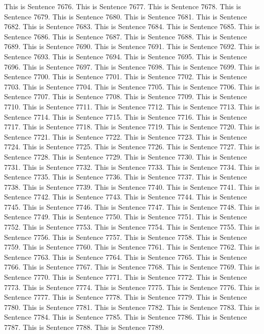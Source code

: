 \documentclass{article}
\begin{document}
This is Sentence 7676.
This is Sentence 7677.
This is Sentence 7678.
This is Sentence 7679.
This is Sentence 7680.
This is Sentence 7681.
This is Sentence 7682.
This is Sentence 7683.
This is Sentence 7684.
This is Sentence 7685.
This is Sentence 7686.
This is Sentence 7687.
This is Sentence 7688.
This is Sentence 7689.
This is Sentence 7690.
This is Sentence 7691.
This is Sentence 7692.
This is Sentence 7693.
This is Sentence 7694.
This is Sentence 7695.
This is Sentence 7696.
This is Sentence 7697.
This is Sentence 7698.
This is Sentence 7699.
This is Sentence 7700.
This is Sentence 7701.
This is Sentence 7702.
This is Sentence 7703.
This is Sentence 7704.
This is Sentence 7705.
This is Sentence 7706.
This is Sentence 7707.
This is Sentence 7708.
This is Sentence 7709.
This is Sentence 7710.
This is Sentence 7711.
This is Sentence 7712.
This is Sentence 7713.
This is Sentence 7714.
This is Sentence 7715.
This is Sentence 7716.
This is Sentence 7717.
This is Sentence 7718.
This is Sentence 7719.
This is Sentence 7720.
This is Sentence 7721.
This is Sentence 7722.
This is Sentence 7723.
This is Sentence 7724.
This is Sentence 7725.
This is Sentence 7726.
This is Sentence 7727.
This is Sentence 7728.
This is Sentence 7729.
This is Sentence 7730.
This is Sentence 7731.
This is Sentence 7732.
This is Sentence 7733.
This is Sentence 7734.
This is Sentence 7735.
This is Sentence 7736.
This is Sentence 7737.
This is Sentence 7738.
This is Sentence 7739.
This is Sentence 7740.
This is Sentence 7741.
This is Sentence 7742.
This is Sentence 7743.
This is Sentence 7744.
This is Sentence 7745.
This is Sentence 7746.
This is Sentence 7747.
This is Sentence 7748.
This is Sentence 7749.
This is Sentence 7750.
This is Sentence 7751.
This is Sentence 7752.
This is Sentence 7753.
This is Sentence 7754.
This is Sentence 7755.
This is Sentence 7756.
This is Sentence 7757.
This is Sentence 7758.
This is Sentence 7759.
This is Sentence 7760.
This is Sentence 7761.
This is Sentence 7762.
This is Sentence 7763.
This is Sentence 7764.
This is Sentence 7765.
This is Sentence 7766.
This is Sentence 7767.
This is Sentence 7768.
This is Sentence 7769.
This is Sentence 7770.
This is Sentence 7771.
This is Sentence 7772.
This is Sentence 7773.
This is Sentence 7774.
This is Sentence 7775.
This is Sentence 7776.
This is Sentence 7777.
This is Sentence 7778.
This is Sentence 7779.
This is Sentence 7780.
This is Sentence 7781.
This is Sentence 7782.
This is Sentence 7783.
This is Sentence 7784.
This is Sentence 7785.
This is Sentence 7786.
This is Sentence 7787.
This is Sentence 7788.
This is Sentence 7789.
\end{document}

